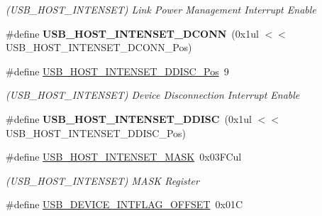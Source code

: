 \begin{DoxyCompactItemize}
\begin{DoxyCompactList}\small\item\em (U\+S\+B\+\_\+\+H\+O\+S\+T\+\_\+\+I\+N\+T\+E\+N\+S\+E\+T) Link Power Management Interrupt Enable \end{DoxyCompactList}\item 
\hypertarget{group___s_a_m_l21___u_s_b_gaa67e44becfb7f0c5556bc190ca5a0efc}{}\#define {\bfseries U\+S\+B\+\_\+\+H\+O\+S\+T\+\_\+\+I\+N\+T\+E\+N\+S\+E\+T\+\_\+\+D\+C\+O\+N\+N}~(0x1ul $<$$<$ U\+S\+B\+\_\+\+H\+O\+S\+T\+\_\+\+I\+N\+T\+E\+N\+S\+E\+T\+\_\+\+D\+C\+O\+N\+N\+\_\+\+Pos)\label{group___s_a_m_l21___u_s_b_gaa67e44becfb7f0c5556bc190ca5a0efc}

\item 
\hypertarget{group___s_a_m_l21___u_s_b_ga1f26f9aa0fe2b03eb69a5a67ba0ee65b}{}\#define \hyperlink{group___s_a_m_l21___u_s_b_ga1f26f9aa0fe2b03eb69a5a67ba0ee65b}{U\+S\+B\+\_\+\+H\+O\+S\+T\+\_\+\+I\+N\+T\+E\+N\+S\+E\+T\+\_\+\+D\+D\+I\+S\+C\+\_\+\+Pos}~9\label{group___s_a_m_l21___u_s_b_ga1f26f9aa0fe2b03eb69a5a67ba0ee65b}

\begin{DoxyCompactList}\small\item\em (U\+S\+B\+\_\+\+H\+O\+S\+T\+\_\+\+I\+N\+T\+E\+N\+S\+E\+T) Device Disconnection Interrupt Enable \end{DoxyCompactList}\item 
\hypertarget{group___s_a_m_l21___u_s_b_gaab46ee9b96725b291d2f7a47a2fb5ad3}{}\#define {\bfseries U\+S\+B\+\_\+\+H\+O\+S\+T\+\_\+\+I\+N\+T\+E\+N\+S\+E\+T\+\_\+\+D\+D\+I\+S\+C}~(0x1ul $<$$<$ U\+S\+B\+\_\+\+H\+O\+S\+T\+\_\+\+I\+N\+T\+E\+N\+S\+E\+T\+\_\+\+D\+D\+I\+S\+C\+\_\+\+Pos)\label{group___s_a_m_l21___u_s_b_gaab46ee9b96725b291d2f7a47a2fb5ad3}

\item 
\hypertarget{group___s_a_m_l21___u_s_b_gace641ab2f45b65760f9ae5fb8aedc624}{}\#define \hyperlink{group___s_a_m_l21___u_s_b_gace641ab2f45b65760f9ae5fb8aedc624}{U\+S\+B\+\_\+\+H\+O\+S\+T\+\_\+\+I\+N\+T\+E\+N\+S\+E\+T\+\_\+\+M\+A\+S\+K}~0x03\+F\+Cul\label{group___s_a_m_l21___u_s_b_gace641ab2f45b65760f9ae5fb8aedc624}

\begin{DoxyCompactList}\small\item\em (U\+S\+B\+\_\+\+H\+O\+S\+T\+\_\+\+I\+N\+T\+E\+N\+S\+E\+T) M\+A\+S\+K Register \end{DoxyCompactList}\item 
\hypertarget{group___s_a_m_l21___u_s_b_ga1e8ab6a5ad00f48f74add2537ad3ab23}{}\#define \hyperlink{group___s_a_m_l21___u_s_b_ga1e8ab6a5ad00f48f74add2537ad3ab23}{U\+S\+B\+\_\+\+D\+E\+V\+I\+C\+E\+\_\+\+I\+N\+T\+F\+L\+A\+G\+\_\+\+O\+F\+F\+S\+E\+T}~0x01\+C\label{group___s_a_m_l21___u_s_b_ga1e8ab6a5ad00f48f74add2537ad3ab23}


\end{DoxyCompactItemize}
